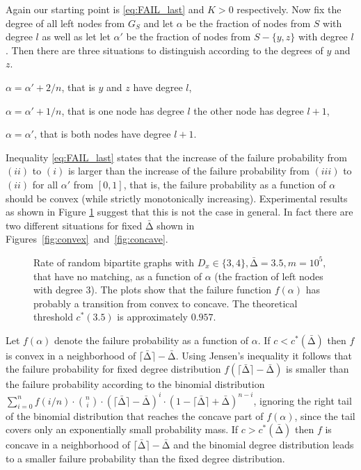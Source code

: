 \let\accentvec\vec \documentclass{llncs}
\newcommand{\figPath}{.}
\newcommand{\randv}{\ensuremath{D}}
\newcommand{\keys}{\ensuremath{n}}
\newcommand{\cells}{\ensuremath{m}}
\newcommand{\mean}{{\mathrm{\scriptstyle\Delta}}}
\newcommand{\Amean}{\bar{\mean}}
\newcommand{\ceil}[1]{\ensuremath{\lceil #1\rceil}}
\newcommand{\graph}{\ensuremath{G}}
\newcommand{\low}{\ensuremath{l}}
\begin{document}
Again our starting point is \eqref{eq:FAIL_last} and $K>0$ respectively. Now fix the degree of all left nodes from $\graph_S$ and
let $\alpha$ be the fraction of nodes from $S$ with degree $\low$ as well as let let $\alpha'$ be the fraction of nodes from $S-\{y,z\}$ with degree $\low$.
Then there are three situations to distinguish according to the degrees of $y$ and $z$.
\begin{compactenum}[$(i)$]
\item $\alpha=\alpha'+2/\keys$, that is $y$ and $z$ have degree $\low$,
\item $\alpha=\alpha'+1/\keys$, that is one node has degree $\low$ the other node has degree $\low+1$,
\item $\alpha=\alpha'$, that is both nodes have degree $\low+1$.
\end{compactenum}
Inequality \eqref{eq:FAIL_last} states that the increase of the failure probability from $(ii)$ to $(i)$ is
larger than the increase of the failure probability from $(iii)$ to $(ii)$ for all $\alpha'$ from $[0,1]$,
that is, the failure probability as a function of $\alpha$ should be convex (while strictly monotonically increasing).
Experimental results as shown in Figure \ref{fig:convex_concave} suggest that this is not the case in general.
In fact there are two different situations for fixed $\Amean$ shown in Figures~\ref{fig:convex}~and~\ref{fig:concave}.
\begin{figure}
\vspace{-0.8cm}
\hspace{-1.5em}
\subfigure[$c<c^*(\Amean)$, $c=0.956$]{\label{fig:convex} \scalebox{0.5}{}}
\hspace{-1.0em}
\subfigure[$c>c^*(\Amean)$, $c=0.958$]{\label{fig:concave}\scalebox{0.5}{}}
\vspace{-0.5cm}
\caption{\label{fig:convex_concave}Rate of random bipartite graphs with $\randv_x\in\{3,4\}, \Amean=3.5, \cells=10^5,$ 
that have no matching, as a function of $\alpha$ (the fraction of left nodes with degree $3$).
The plots show that the failure function $f(\alpha)$ has probably a transition from convex to concave.
The theoretical threshold $c^*(3.5)$ is approximately $0.957$.}
\vspace{-0.5cm}
\end{figure}
Let $f(\alpha)$ denote the failure probability as a function of $\alpha$.
If $c<c^*(\Amean)$ then
$f$ is convex in a neighborhood of $\ceil{\Amean}-\Amean$. 
Using Jensen's inequality it follows that the failure probability for fixed degree distribution $f(\ceil{\Amean}-\Amean)$ is smaller than 
the failure probability according to the binomial distribution $\sum_{i=0}^\keys f(i/\keys) \cdot \binom{\keys}{i} \cdot (\ceil{\Amean}-\Amean)^i\cdot (1-\ceil{\Amean}+\Amean)^{\keys-i}$,
ignoring the right tail of the binomial distribution that reaches the concave part of $f(\alpha)$, since the tail covers only an exponentially small probability mass.
If $c>c^*(\Amean)$ then $f$ is concave in a neighborhood of $\ceil{\Amean}-\Amean$ and the binomial degree distribution leads to
a smaller failure probability than the fixed degree distribution.
\end{document}
